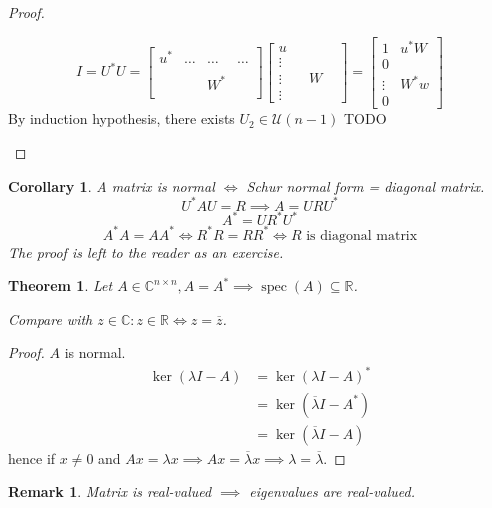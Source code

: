 \documentclass{article}
\newtheorem{theorem}{Theorem}  \numberwithin{theorem}{section}
\newtheorem{remark}{Remark}  \numberwithin{remark}{section}
\newtheorem{corollary}{Corollary}  \numberwithin{corollary}{section}
\begin{document}
\begin{proof}
\begin{description}
      \[ I = U^* U = \begin{bmatrix} u^* & \dots & \dots & \dots \\ & & & \\ & & W^* & \\ & & & \end{bmatrix} \begin{bmatrix} u & & & \\ \vdots & & & \\ \vdots & & W & \\ \vdots & & & \end{bmatrix} = \begin{bmatrix} 1 & u^* W \\ 0 & \\ \vdots & W^* w \\ 0 & \end{bmatrix} \]
      By induction hypothesis, there exists $U_2 \in \mathcal U(n-1)$ TODO
  \end{description}
\end{proof}

\begin{corollary}
  A matrix is normal $\iff$ Schur normal form = diagonal matrix.
  \[ U^* AU = R \implies A = URU^* \]
  \[ A^* = UR^* U^* \]
  \[ A^* A = AA^* \iff R^* R = RR^* \iff R \text{ is diagonal matrix} \]
  The proof is left to the reader as an exercise.
\end{corollary}

\begin{theorem} %
  Let $A \in \mathbb C^{n \times n}, A = A^* \implies \operatorname{spec}(A) \subseteq \mathbb R$.

  Compare with $z \in \mathbb C: z \in \mathbb R \iff z = \overline{z}$.
\end{theorem}

\begin{proof}
  $A$ is normal.
  \begin{align*}
    \ker(\lambda I - A) &= \ker(\lambda I - A)^* \\
      &= \ker(\overline{\lambda} I - A^*) \\
      &= \ker(\overline{\lambda} I - A)
  \end{align*}
  hence if $x \neq 0$ and $Ax = \lambda x \implies Ax = \overline{\lambda} x \implies \lambda = \overline\lambda$.
\end{proof}

\begin{remark}
  Matrix is real-valued $\implies$ eigenvalues are real-valued.
\end{remark}
\end{document}
